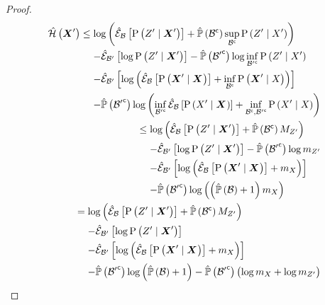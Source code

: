 \begin{proof}
	\begin{align}
		\begin{split}
			\entropyEstimator{\statesRV{}^\prime}&\leq\log\left(\partialestimator{\probcond{\observations{}^\prime}{\statesRV{}^\prime}}{\subSpace}+\estimatedmeasure{\stcomp{\subSpace}}\sup_{\stcomp{\subSpace}}\probcond{\observations{}^\prime}{\states{}^\prime}\right)\\
			&\phantomeq-\partialestimator{\log\probcond{\observations{}^\prime}{\statesRV{}^\prime}}{\subSpace^\prime}-\estimatedmeasure{\stcomp{\subSpace^\prime}}\log\inf_{\stcomp{\subSpace^\prime}}\probcond{\observations{}^\prime}{\states{}^\prime}\\
			&\phantomeq-\partialestimator{\log\left(\partialestimator{\probcond{\statesRV{}^\prime}{\statesRV{}}}{\subSpace}+\inf_{\stcomp{\subSpace}}\probcond{\statesRV{}^\prime}{\states{}}\right)}{\subSpace^\prime}\\
			&\phantomeq-\estimatedmeasure{\stcomp{\subSpace^\prime}}\log\left(\inf_{\stcomp{\subSpace^\prime}}\partialestimator{\probcond{\states{}^\prime}{\statesRV{}}}{\subSpace}+\inf_{\stcomp{\subSpace},\stcomp{\subSpace^\prime}}\probcond{\states{}^\prime}{\states{}}\right)
		\end{split}\\
		\begin{split}
			&\leq\log\left(\partialestimator{\probcond{\observations{}^\prime}{\statesRV{}^\prime}}{\subSpace}+\estimatedmeasure{\stcomp{\subSpace}}M_{\observations{}^\prime}\right)\\
			&\phantomeq-\partialestimator{\log\probcond{\observations{}^\prime}{\statesRV{}^\prime}}{\subSpace^\prime}-\estimatedmeasure{\stcomp{\subSpace^\prime}}\log m_{\observations{}^\prime}\\
			&\phantomeq-\partialestimator{\log\left(\partialestimator{\probcond{\statesRV{}^\prime}{\statesRV{}}}{\subSpace}+m_{\states{}}\right)}{\subSpace^\prime}\\
			&\phantomeq-\estimatedmeasure{\stcomp{\subSpace^\prime}}\log\left(\left(\estimatedmeasure{\subSpace}+1\right)m_{\states{}}\right)
		\end{split}\\
		\begin{split}
			&=\log\left(\partialestimator{\probcond{\observations{}^\prime}{\statesRV{}^\prime}}{\subSpace}+\estimatedmeasure{\stcomp{\subSpace}}M_{\observations{}^\prime}\right)\\
			&\phantomeq-\partialestimator{\log\probcond{\observations{}^\prime}{\statesRV{}^\prime}}{\subSpace^\prime}\\
			&\phantomeq-\partialestimator{\log\left(\partialestimator{\probcond{\statesRV{}^\prime}{\statesRV{}}}{\subSpace}+m_{\states{}}\right)}{\subSpace^\prime}\\
			&\phantomeq-\estimatedmeasure{\stcomp{\subSpace^\prime}}\log\left(\estimatedmeasure{\subSpace}+1\right) -\estimatedmeasure{\stcomp{\subSpace^\prime}}\left(\log m_{\states{}}+\log m_{\observations{}^\prime}\right)
		\end{split}
	\end{align}
\end{proof}

